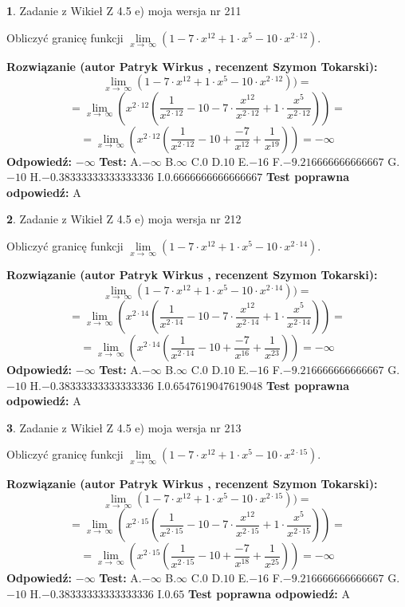 \documentclass[12pt, a4paper]{article}
\theoremstyle{definition} %
\newtheorem{zad}{}
\newcommand{\zadStart}[1]{\begin{zad}#1\newline}
\newcommand{\zadStop}{\end{zad}}
\newcommand{\rozwStart}[2]{\noindent \textbf{Rozwiązanie (autor #1 , recenzent #2): }\newline}
\newcommand{\rozwStop}{\newline}
\newcommand{\odpStart}{\noindent \textbf{Odpowiedź:}\newline}
\newcommand{\odpStop}{\newline}
\newcommand{\testStart}{\noindent \textbf{Test:}\newline}
\newcommand{\testStop}{\newline}
\newcommand{\kluczStart}{\noindent \textbf{Test poprawna odpowiedź:}\newline}
\newcommand{\kluczStop}{\newline}
\begin{document}
\zadStart{Zadanie z Wikieł Z 4.5 e) moja wersja nr 211}


Obliczyć granicę funkcji  $\lim\limits_{x\to\ \infty}(1 - 7 \cdot x^{12}+1 \cdot x^{5}- 10 \cdot x^{2\cdot12})$.
\zadStop
\rozwStart{Patryk Wirkus}{Szymon Tokarski}
$$\lim\limits_{x\to\ \infty}(1 - 7 \cdot x^{12}+1 \cdot x^{5}- 10 \cdot x^{2\cdot12}))=$$
$$=\lim\limits_{x\to\ \infty}(x^{2\cdot12}(\frac{1}{x^{2\cdot12}}-10 -7 \cdot \frac{x^{12}}{x^{2\cdot12}}+1 \cdot \frac{x^{5}}{x^{2\cdot12}}))=$$
$$=\lim\limits_{x\to\ \infty}(x^{2\cdot12}(\frac{1}{x^{2\cdot12}}-10 + \frac{-7}{x^{12}}+ \frac{1}{x^{19}}))=-\infty$$
\rozwStop
\odpStart
$-\infty$
\odpStop
\testStart
A.$-\infty$ B.$\infty$ C.$0$ D.$10$ E.$-16$
F.$-9.216666666666667$ G.$-10$
H.$-0.38333333333333336$
I.$0.6666666666666667$
\testStop
\kluczStart
A
\kluczStop



\zadStart{Zadanie z Wikieł Z 4.5 e) moja wersja nr 212}


Obliczyć granicę funkcji  $\lim\limits_{x\to\ \infty}(1 - 7 \cdot x^{12}+1 \cdot x^{5}- 10 \cdot x^{2\cdot14})$.
\zadStop
\rozwStart{Patryk Wirkus}{Szymon Tokarski}
$$\lim\limits_{x\to\ \infty}(1 - 7 \cdot x^{12}+1 \cdot x^{5}- 10 \cdot x^{2\cdot14}))=$$
$$=\lim\limits_{x\to\ \infty}(x^{2\cdot14}(\frac{1}{x^{2\cdot14}}-10 -7 \cdot \frac{x^{12}}{x^{2\cdot14}}+1 \cdot \frac{x^{5}}{x^{2\cdot14}}))=$$
$$=\lim\limits_{x\to\ \infty}(x^{2\cdot14}(\frac{1}{x^{2\cdot14}}-10 + \frac{-7}{x^{16}}+ \frac{1}{x^{23}}))=-\infty$$
\rozwStop
\odpStart
$-\infty$
\odpStop
\testStart
A.$-\infty$ B.$\infty$ C.$0$ D.$10$ E.$-16$
F.$-9.216666666666667$ G.$-10$
H.$-0.38333333333333336$
I.$0.6547619047619048$
\testStop
\kluczStart
A
\kluczStop



\zadStart{Zadanie z Wikieł Z 4.5 e) moja wersja nr 213}


Obliczyć granicę funkcji  $\lim\limits_{x\to\ \infty}(1 - 7 \cdot x^{12}+1 \cdot x^{5}- 10 \cdot x^{2\cdot15})$.
\zadStop
\rozwStart{Patryk Wirkus}{Szymon Tokarski}
$$\lim\limits_{x\to\ \infty}(1 - 7 \cdot x^{12}+1 \cdot x^{5}- 10 \cdot x^{2\cdot15}))=$$
$$=\lim\limits_{x\to\ \infty}(x^{2\cdot15}(\frac{1}{x^{2\cdot15}}-10 -7 \cdot \frac{x^{12}}{x^{2\cdot15}}+1 \cdot \frac{x^{5}}{x^{2\cdot15}}))=$$
$$=\lim\limits_{x\to\ \infty}(x^{2\cdot15}(\frac{1}{x^{2\cdot15}}-10 + \frac{-7}{x^{18}}+ \frac{1}{x^{25}}))=-\infty$$
\rozwStop
\odpStart
$-\infty$
\odpStop
\testStart
A.$-\infty$ B.$\infty$ C.$0$ D.$10$ E.$-16$
F.$-9.216666666666667$ G.$-10$
H.$-0.38333333333333336$
I.$0.65$
\testStop
\kluczStart
A
\kluczStop
\end{document}
